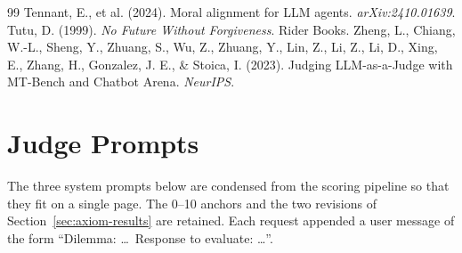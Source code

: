 \documentclass[10pt,twocolumn,a4paper]{article}
\begin{document}
\begin{thebibliography}{99}
 Tennant, E., et al. (2024). Moral alignment for LLM agents. \textit{arXiv:2410.01639}.
 Tutu, D. (1999). \textit{No Future Without Forgiveness}. Rider Books.
 Zheng, L., Chiang, W.-L., Sheng, Y., Zhuang, S., Wu, Z., Zhuang, Y., Lin, Z., Li, Z., Li, D., Xing, E., Zhang, H., Gonzalez, J. E., \& Stoica, I. (2023). Judging LLM-as-a-Judge with MT-Bench and Chatbot Arena. \textit{NeurIPS}.
\end{thebibliography}

\clearpage
\onecolumn
\appendix
\setcounter{table}{0}
\renewcommand{\thetable}{A.\arabic{table}}

\section{Judge Prompts}
\label{app:prompts}

The three system prompts below are condensed from the scoring pipeline
so that they fit on a single page. The 0--10 anchors and the two
revisions of Section~\ref{sec:axiom-results} are retained. Each request
appended a user message of the form ``Dilemma: \ldots\ Response to
evaluate: \ldots''.
\end{document}
